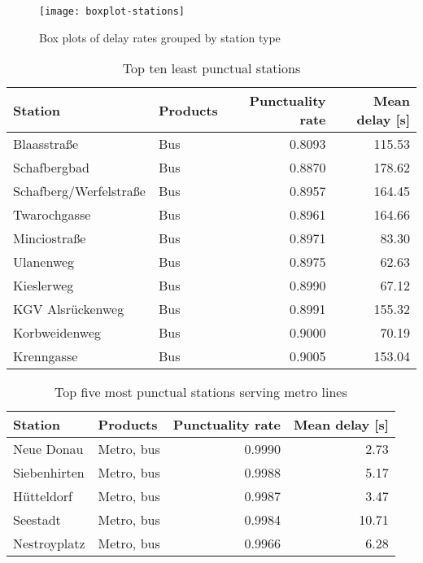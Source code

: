 \begin{figure}[h]
	\centering
	\texttt{[image: boxplot-stations]}
	\caption{Box plots of delay rates grouped by station type}
	\label{fig:boxplot-stations}
\end{figure}

\begin{table}
	\centering
	\begin{tabular}{llrr}
		\toprule
		Station & Products & Punctuality rate & Mean delay [s] \\
		\midrule
		Blaasstraße & Bus & 0.8093 & 115.53 \\
		Schafbergbad & Bus &  0.8870 & 178.62 \\
		Schafberg/Werfelstraße & Bus &  0.8957 & 164.45 \\
		Twarochgasse & Bus &   0.8961 & 164.66 \\
		Minciostraße & Bus &   0.8971 & 83.30 \\
		Ulanenweg & Bus &   0.8975 & 62.63 \\
		Kieslerweg & Bus &   0.8990 & 67.12 \\
		KGV Alsrückenweg & Bus &   0.8991 & 155.32 \\
		Korbweidenweg & Bus &   0.9000 & 70.19 \\
		Krenngasse & Bus &   0.9005 & 153.04 \\
		\bottomrule
	\end{tabular}
	\caption{Top ten least punctual stations}
	\label{table:stations-least-10}
\end{table}


\begin{table}
	\centering
	\begin{tabular}{llrr}
		\toprule
		Station & Products & Punctuality rate & Mean delay [s] \\
		\midrule
		Neue Donau & Metro, bus & 0.9990 & 2.73 \\
		Siebenhirten & Metro, bus &  0.9988 & 5.17 \\
		Hütteldorf & Metro, bus  & 0.9987 & 3.47 \\
		Seestadt & Metro, bus & 0.9984 & 10.71 \\
		Nestroyplatz &  Metro, bus  & 0.9966 & 6.28 \\
		\bottomrule
	\end{tabular}
	\caption{Top five most punctual stations serving metro lines}
	\label{table:metro-stations-top5-most}
\end{table}

